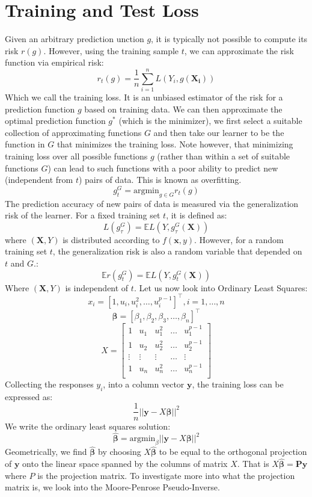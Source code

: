 \documentclass[12pt]{article}
\begin{document}
\section{Training and Test Loss}
Given an arbitrary prediction unction $g$, it is typically not possible to compute its risk $r(g)$. However, using the training sample $t$, we can approximate the risk function via empirical risk:
\[r_t(g) = \frac{1}{n}\sum_{i=1}^{n}L(Y_i,g(\mathbf{X_i}))\]
Which we call the training loss. It is an unbiased estimator of the risk for a prediction function $g$ based on training data. We can then approximate the optimal prediction function $g^*$ (which is the minimizer), we first select a suitable collection of approximating functions $G$ and then take our learner to be the function in $G$ that minimizes the training loss. Note however, that minimizing training loss over all possible functions $g$ (rather than within a set of suitable functions $G$) can lead to such functions with a poor ability to predict new (independent from $t$) pairs of data. This is known as overfitting. 
\[g_t^G = \text{argmin}_{g\in G} r_t(g)\]
The prediction accuracy of new pairs of data is measured via the generalization risk of the learner. For a fixed training set $t$, it is defined as:
\[L(g_\tau^G) = \mathbb{E}L(Y, g_\tau^G(\mathbf{X}))\]
where $(\mathbf{X}, Y)$ is distributed according to $f(\mathbf{x}, y)$. However, for a random training set $t$, the generalization risk is also a random variable that depended on $t$ and $G$.:
\[\mathbb{E}r(g_t^G) = \mathbb{E}L(Y, g_t^G(\mathbf{X}))\]
Where $(\mathbf{X}, Y)$ is independent of $t$. Let us now look into Ordinary Least Squares:
\[x_i = [1, u_i, u_i^2, \dots, u_i^{p-1}]^\top, i=1,\dots,n\]
\[\boldsymbol{\beta} = [\beta_1, \beta_2, \beta_3, \dots, \beta_n]^\top\]
\[X = 
\begin{bmatrix}
    1 & u_1 & u_1^2 & \dots & u_1^{p-1} \\
    1 & u_2 & u_2^2 & \dots & u_2^{p-1} \\
    \vdots & \vdots & \vdots & \dots & \vdots \\
    1 & u_n & u_n^2 & \dots & u_n^{p-1} \\
\end{bmatrix}\]
Collecting the responses {$y_i$}, into a column vector $\mathbf{y}$, the training loss can be expressed as:
\[\frac{1}{n}||\mathbf{y} - X\boldsymbol{\beta}||^2\]
We write the ordinary least squares solution:
\[\hat{\boldsymbol{\beta}} = \text{argmin}_\beta ||\mathbf{y} - X\boldsymbol{\beta}||^2\]
Geometrically, we find $\hat{\boldsymbol{\beta}}$ by choosing $X\hat{\boldsymbol{\beta}}$ to be equal to the orthogonal projection of $\mathbf{y}$ onto the linear space spanned by the columns of matrix $X$. That is $X\hat{\boldsymbol{\beta}} = \mathbf{Py}$ where $P$ is the projection matrix. To investigate more into what the projection matrix is, we look into the Moore-Penrose Pseudo-Inverse.\\
\end{document}
